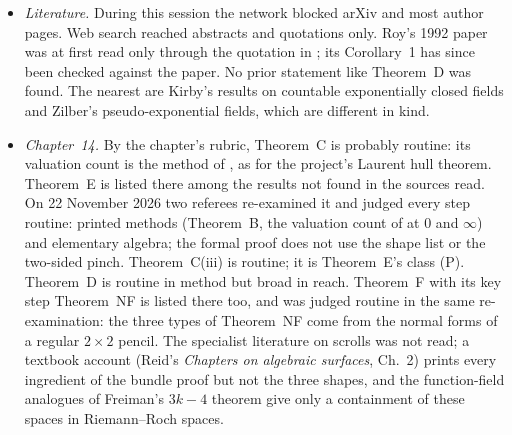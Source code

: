 \documentclass[11pt,a4paper]{article}
\theoremstyle{plain}
\theoremstyle{definition}
\begin{document}
\begin{itemize}
products span only four dimensions, a configuration is a progression by \cite[Lemma~4]{BSZ17}. The six results that
close Theorem~F's caveats (23 October 2026, above) are routine and were not found in the sources read.
\item \emph{Literature.} During this session the network blocked arXiv and most author
pages. Web search reached abstracts and quotations only. Roy's 1992 paper was at first read
only through the quotation in \cite{Mak23}; its Corollary~1 has since been checked against the
paper. No prior statement like Theorem~D was found. The
nearest are Kirby's results on countable exponentially closed fields and Zilber's
pseudo-exponential fields, which are different in kind.
\item \emph{Chapter~14.} By the chapter's rubric, Theorem~C is probably routine: its
valuation count is the method of \cite[\S7, proof of Th.~33]{BSZ17}, as for the project's Laurent hull theorem.
Theorem~E is listed there among the results not found in the sources read. On 22 November 2026 two referees
re-examined it and judged every step routine: printed methods (Theorem~B, the valuation count of \cite[\S7]{BSZ17}
at $0$ and $\infty$) and elementary algebra; the formal proof does not use the shape list or the two-sided pinch.
Theorem~C(iii) is routine; it is Theorem~E's class (P). Theorem~D is routine in method but broad in
reach. Theorem~F with its key step Theorem~NF is listed there too, and was judged routine in the same
re-examination: the three types of Theorem~NF come from the normal forms of a regular $2\times2$ pencil. The
specialist literature on scrolls was not read; a textbook account (Reid's \emph{Chapters on algebraic
surfaces}, Ch.~2) prints every ingredient of the bundle proof but not the three shapes, and the function-field
analogues of Freiman's $3k-4$ theorem give only a containment of these spaces in Riemann--Roch spaces.
\end{itemize}
\end{document}

